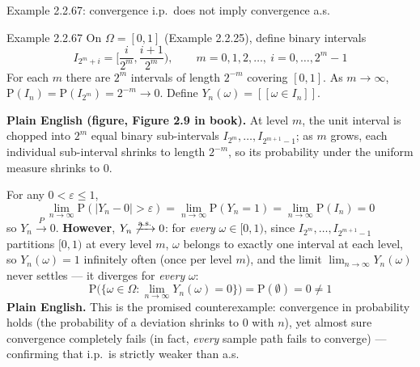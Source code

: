 \documentclass[aspectratio=169,10pt]{beamer}
\begin{document}
\begin{frame}[allowframebreaks]{Example 2.2.67: convergence i.p.\ does not imply convergence a.s.}
\begin{block}{Example 2.2.67}
On $\Omega=[0,1]$ (Example 2.2.25), define binary intervals
\[ I_{2^m+i} = \Big[\frac{i}{2^m},\frac{i+1}{2^m}\Big), \qquad m=0,1,2,\ldots,\ i=0,\ldots,2^m-1 \]
For each $m$ there are $2^m$ intervals of length $2^{-m}$ covering $[0,1]$.
As $m\to\infty$, $\mathrm{P}(I_n)=\mathrm{P}(I_{2^m})=2^{-m}\to 0$. Define
$Y_n(\omega) = [\![\omega\in I_n]\!]$.
\end{block}

\begin{center}
\end{center}
\textbf{Plain English (figure, Figure 2.9 in book).} At level $m$, the unit
interval is chopped into $2^m$ equal binary sub-intervals $I_{2^m},\ldots,I_{2^{m+1}-1}$;
as $m$ grows, each individual sub-interval shrinks to length $2^{-m}$, so its
probability under the uniform measure shrinks to 0.

\framebreak

For any $0<\varepsilon\leq1$,
\[ \lim_{n\to\infty}\mathrm{P}(|Y_n-0|>\varepsilon) = \lim_{n\to\infty}\mathrm{P}(Y_n=1) = \lim_{n\to\infty}\mathrm{P}(I_n)=0 \]
so $Y_n\xrightarrow{P}0$. \textbf{However}, $Y_n\not\xrightarrow{\text{a.s.}}0$:
for \emph{every} $\omega\in[0,1)$, since $I_{2^m},\ldots,I_{2^{m+1}-1}$
partitions $[0,1)$ at every level $m$, $\omega$ belongs to exactly one
interval at each level, so $Y_n(\omega)=1$ infinitely often (once per level
$m$), and the limit $\lim_{n\to\infty}Y_n(\omega)$ never settles --- it
diverges for \emph{every} $\omega$:
\[ \mathrm{P}\big(\{\omega\in\Omega : \lim_{n\to\infty}Y_n(\omega)=0\}\big) = \mathrm{P}(\emptyset) = 0 \neq 1 \]
\textbf{Plain English.} This is the promised counterexample: convergence in
probability holds (the probability of a deviation shrinks to 0 with $n$),
yet almost sure convergence completely fails (in fact, \emph{every} sample
path fails to converge) --- confirming that i.p.\ is strictly weaker than a.s.
\end{frame}
\end{document}

